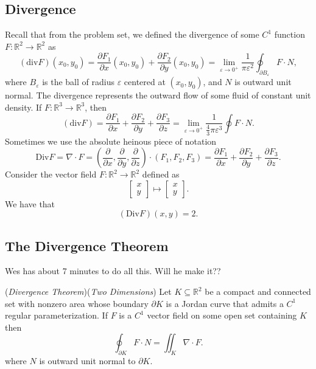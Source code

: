 \documentclass[11pt]{article}
\theoremstyle{definition}
\newcommand{\R}{\mathbb{R}}                      %
\newcommand{\mat}{\begin{bmatrix}}
\newcommand{\trix}{\end{bmatrix}}
\newcommand{\dell}{\partial}
\begin{document}
\subsection{Divergence}
Recall that from the problem set, we defined the divergence of some $C^1$ function $F:\R^2\to \R^2$ as 
$$
(\mathrm{div}F)(x_0,y_0) = \frac{\dell F_1}{\dell x}(x_0,y_0)+\frac{\dell F_2}{\dell y}(x_0,y_0)=\lim_{\varepsilon\to 0^+} \frac{1}{\pi\varepsilon^2} \oint_{\dell B_\varepsilon}F\cdot N,
$$
where $B_\varepsilon$ is the ball of radius $\varepsilon$ centered at $(x_0,y_0)$, and $N$ is outward unit normal. The divergence represents the outward flow of some fluid of constant unit density. If $F:\R^3\to\R^3$, then
$$
(\mathrm{div}F)=\frac{\dell F_1}{\dell x}+\frac{\dell F_2}{\dell y}+\frac{\dell F_3}{\dell z}=\lim_{\varepsilon\to 0^+}\frac{1}{\frac{4}{3}\pi \varepsilon^3}\oint F\cdot N.
$$
Sometimes we use the absolute heinous piece of notation
$$
\mathrm{Div}F = \nabla\cdot F =\left(\frac{\dell }{\dell x}, \frac{\dell }{\dell y}, \frac{\dell }{\dell z}\right)\cdot (F_1,F_2,F_3)=\frac{\dell F_1}{\dell x} + \frac{\dell F_2}{\dell y} +\frac{\dell F_3}{\dell z}.
$$
\ex Consider the vector field $F:\R^2\to\R^2$ defined as
$$
\mat x \\ y \trix \mapsto \mat x \\ y \trix.
$$
We have that 
$$
(\mathrm{Div}F)(x,y)=2.
$$

\subsection{The Divergence Theorem}
Wes has about 7 minutes to do all this. Will he make it??
\begin{shaded}
\theorem (\textit{Divergence Theorem})(\textit{Two Dimensions}) Let $K\subseteq \R^2$ be a compact and connected set with nonzero area whose boundary $\dell K$ is a Jordan curve that admits a $C^1$ regular parameterization. If $F$ is a $C^1$ vector field on some open set containing $K$ then 
$$
\oint_{\partial K} F\cdot N = \iint_K \nabla\cdot F.
$$
where $N$ is outward unit normal to $\dell K$.
\end{shaded}
\end{document}
